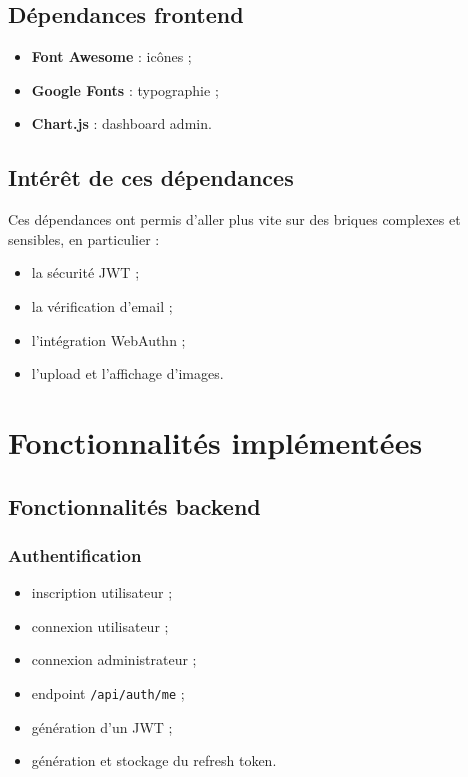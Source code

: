 \documentclass[12pt,a4paper]{report}
\begin{document}
\section{Dépendances frontend}

\begin{itemize}[leftmargin=1.2cm]
    \item \textbf{Font Awesome} : icônes ;
    \item \textbf{Google Fonts} : typographie ;
    \item \textbf{Chart.js} : dashboard admin.
\end{itemize}

\section{Intérêt de ces dépendances}

Ces dépendances ont permis d'aller plus vite sur des briques complexes et sensibles, en particulier :
\begin{itemize}[leftmargin=1.2cm]
    \item la sécurité JWT ;
    \item la vérification d'email ;
    \item l'intégration WebAuthn ;
    \item l'upload et l'affichage d'images.
\end{itemize}

\chapter{Fonctionnalités implémentées}

\section{Fonctionnalités backend}

\subsection{Authentification}
\begin{itemize}[leftmargin=1.2cm]
    \item inscription utilisateur ;
    \item connexion utilisateur ;
    \item connexion administrateur ;
    \item endpoint \texttt{/api/auth/me} ;
    \item génération d'un JWT ;
    \item génération et stockage du refresh token.
\end{itemize}
\end{document}
